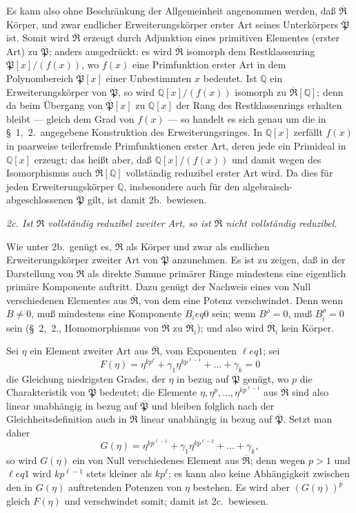 \documentclass[12pt,a4paper]{article}
\newcommand{\mf}[1]{\mathfrak{#1}}     %
\newcommand{\PP}{\mathfrak{P}}          %
\newcommand{\QQ}{\mathbb{Q}}            %
\theoremstyle{definition}
\begin{document}
Es kann also ohne Beschr\"ankung der Allgemeinheit angenommen werden, da\ss{}
$\overline{\mf{R}}$ K\"orper, und zwar endlicher Erweiterungsk\"orper erster Art
seines Unterk\"orpers $\overline{\PP}$ ist. Somit wird $\overline{\mf{R}}$ erzeugt durch
Adjunktion eines primitiven Elementes (erster Art) zu $\overline{\PP}$;
anders ausgedr\"uckt: es wird $\overline{\mf{R}}$ isomorph dem Restklassenring
$\overline{\PP}[x]/(f(x))$, wo $f(x)$ eine Primfunktion erster Art in dem
Polynombereich $\overline{\PP}[x]$ einer Unbestimmten $x$ bedeutet. Ist $\QQ$
ein Erweiterungsk\"orper von $\overline{\PP}$, so wird $\QQ[x]/(f(x))$ isomorph zu
$\overline{\mf{R}}[\QQ]$; denn da beim \"Ubergang von $\overline{\PP}[x]$ zu $\QQ[x]$ der
Rang des Restklassenrings erhalten bleibt --- gleich dem Grad von $f(x)$ ---
so handelt es sich genau um die in \S~1,~2.\ angegebene Konstruktion des
Erweiterungsringes. In $\QQ[x]$ zerf\"allt $f(x)$ in paarweise teilerfremde
Primfunktionen erster Art, deren jede ein Primideal in $\QQ[x]$ erzeugt;
das hei\ss t aber, da\ss{} $\QQ[x]/(f(x))$ und damit wegen des Isomorphismus
auch $\overline{\mf{R}}[\QQ]$ vollst\"andig reduzibel erster Art wird. Da dies
f\"ur jeden Erweiterungsk\"orper $\QQ$, insbesondere auch f\"ur den
algebraisch-abgeschlossenen $\overline{\PP}$ gilt, ist damit 2b.\ bewiesen.

\smallskip

\textit{2c. Ist $\mf{R}$ vollst\"andig reduzibel zweiter Art, so ist
$\overline{\mf{R}}$ nicht vollst\"andig reduzibel.}

Wie unter 2b.\ gen\"ugt es, $\overline{\mf{R}}$ als K\"orper und zwar als
endlichen Erweiterungsk\"orper zweiter Art von $\overline{\PP}$ anzunehmen.
Es ist zu zeigen, da\ss{} in der Darstellung von $\overline{\mf{R}}$ als direkte Summe
prim\"arer Ringe mindestens eine eigentlich prim\"are Komponente auftritt.
Dazu gen\"ugt der Nachweis eines von Null verschiedenen Elementes aus
$\overline{\mf{R}}$, von dem eine Potenz verschwindet. Denn wenn $B \neq 0$,
mu\ss{} mindestens eine Komponente $B_i  eq 0$ sein; wenn $B^\rho = 0$, mu\ss{}
$B_i^\rho = 0$ sein (\S~2,~2., Homomorphismus von $\overline{\mf{R}}$ zu
$\overline{\mf{R}}_i$); und also wird $\overline{\mf{R}}_i$ kein K\"orper.

Sei $\eta$ ein Element zweiter Art aus $\overline{\mf{R}}$, vom Exponenten
$\ell  eq 1$; sei
\[
F(\eta) = \eta^{kp^\ell} + \gamma_1 \eta^{kp^{\ell-1}} + \dots + \gamma_k = 0
\]
die Gleichung niedrigsten Grades, der $\eta$ in bezug auf $\overline{\PP}$ gen\"ugt,
wo $p$ die Charakteristik von $\overline{\PP}$ bedeutet; die Elemente
$\eta, \eta^p, \dots, \eta^{kp^{\ell-1}}$ aus $\overline{\mf{R}}$ sind also linear
unabh\"angig in bezug auf $\overline{\PP}$ und bleiben folglich nach der
Gleichheitsdefinition auch in $\overline{\mf{R}}$ linear unabh\"angig in bezug
auf $\overline{\PP}$. Setzt man daher
\[
G(\eta) = \eta^{kp^{\ell-1}} + \gamma_1 \eta^{kp^{\ell-2}} + \dots + \gamma_k,
\]
so wird $G(\eta)$ ein von Null verschiedenes Element aus $\overline{\mf{R}}$;
denn wegen $p > 1$ und $\ell  eq 1$ wird $kp^{\ell-1}$ stets kleiner als
$kp^\ell$; es kann also keine Abh\"angigkeit zwischen den in $G(\eta)$
auftretenden Potenzen von $\eta$ bestehen. Es wird aber $(G(\eta))^p$
gleich $F(\eta)$ und verschwindet somit; damit ist 2c.\ bewiesen.
\end{document}
